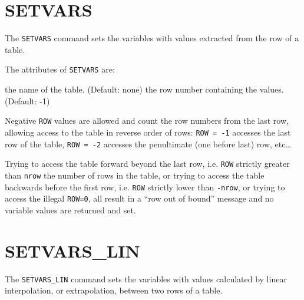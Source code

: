 
\section{SETVARS}
\label{sec:setvars}

The \texttt{SETVARS} command sets the variables with values extracted
from the row of a table.


The attributes of \texttt{SETVARS} are:
\begin{madlist}
   the name of the table. (Default: none)
   the row number containing the values. (Default: -1)
\end{madlist}

Negative \texttt{ROW} values are allowed and count the row numbers from
the last row, allowing access to the table in reverse order of rows:
\texttt{ROW~=~-1} accesses the last row of the table,
\texttt{ROW~=~-2} accesses the penultimate (one before last) row,
etc\ldots  

Trying to access the table forward beyond the last row, i.e. \texttt{ROW}
strictly greater than \texttt{nrow} the number of rows in the table, or
trying to access the table backwards before the first row, i.e. \texttt{ROW}
strictly lower than \texttt{-nrow}, or trying to access the illegal
\texttt{ROW=0}, all result in a ``row out of bound'' message and no
variable values are returned and set.  



\section{SETVARS\_LIN}
\label{sec:setvars-lin}

The \texttt{SETVARS\_LIN} command sets the variables with values calculated
by linear interpolation, or extrapolation, between two rows of a table. 


